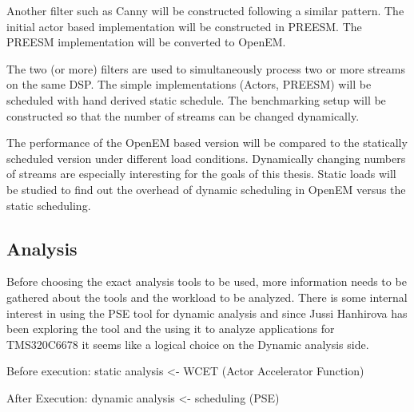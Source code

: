 Another filter such as Canny will be constructed following a similar pattern. The initial actor based implementation will be constructed in PREESM. The PREESM implementation will be converted to OpenEM.

The two (or more) filters are used to simultaneously process two or more streams on the same DSP. The simple implementations (Actors, PREESM) will be scheduled with hand derived static schedule. The benchmarking setup will be constructed so that the number of streams can be changed dynamically.

The performance of the OpenEM based version will be compared to the statically scheduled version under different load conditions. Dynamically changing numbers of streams are especially interesting for the goals of this thesis. Static loads will be studied to find out the overhead of dynamic scheduling in OpenEM versus the static scheduling. 

\subsection{Analysis}
Before choosing the exact analysis tools to be used, more information needs to be gathered about the tools and the workload to be analyzed. There is some internal interest in using the PSE tool for dynamic analysis and since Jussi Hanhirova has been exploring the tool and the using it to analyze applications for TMS320C6678 it seems like a logical choice on the Dynamic analysis side.

Before execution: static analysis <- WCET (Actor Accelerator Function)

After Execution: dynamic analysis <- scheduling (PSE)
